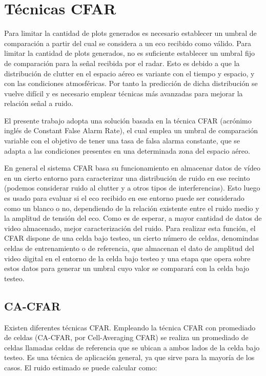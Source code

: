\section{Técnicas CFAR}

Para limitar la cantidad de plots generados es necesario establecer un umbral de comparación a partir del cual se considera a un eco recibido como válido. Para limitar la cantidad de plots generados, no es suficiente establecer un umbral fijo de comparación para la señal recibida por el radar. Esto es debido a que la distribución de clutter en el espacio aéreo es variante con el tiempo y espacio, y con las condiciones atmosféricas. Por tanto la predicción de dicha distribución se vuelve difícil y es necesario emplear técnicas más avanzadas para mejorar la relación señal a ruido.

El presente trabajo adopta una solución basada en la técnica CFAR (acrónimo inglés de Constant False Alarm Rate), el cual emplea un umbral de comparación variable con el objetivo de tener una tasa de falsa alarma constante, que se adapta a las condiciones presentes en una determinada zona del espacio aéreo.


En general el sistema CFAR basa su funcionamiento en almacenar datos de vídeo en un cierto entorno para caracterizar una distribución de ruido en ese recinto (podemos considerar ruido al clutter y a otros tipos de interferencias). Esto luego es usado para evaluar si el eco recibido en ese entorno puede ser considerado como un blanco o no, dependiendo de la relación existente entre el ruido medio y la amplitud de tensión del eco. Como es de esperar, a mayor cantidad de datos de video almacenado, mejor caracterización del ruido. Para realizar esta función, el CFAR dispone de una celda bajo testeo, un cierto número de celdas, denomindas celdas de entrenamiento o de referencia, que almacenan el dato de amplitud del video digital en el entorno de la celda bajo testeo y una etapa que opera sobre estos datos para generar un umbral cuyo valor se comparará con la celda bajo testeo.

\subsection{CA-CFAR}

Existen diferentes técnicas CFAR. Empleando la técnica CFAR con promediado de celdas (CA-CFAR, por Cell-Averaging CFAR) se realiza un promediado de celdas llamadas celdas de referencia que se ubican a ambos lados de la celda bajo testeo. Es una técnica de aplicación general, ya que sirve para la mayoría de los casos. El ruido estimado se puede calcular como:

